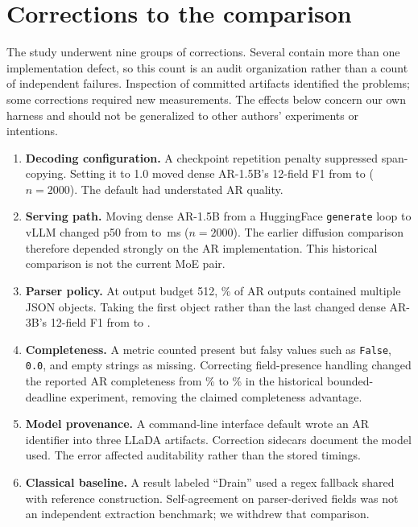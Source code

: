 \section{Corrections to the comparison}
\label{app:defects}

The study underwent nine groups of corrections. Several contain more than
one implementation defect, so this count is an audit organization rather
than a count of independent failures. Inspection of committed artifacts
identified the problems; some corrections required new measurements.
The effects below concern our own harness and should not be generalized
to other authors' experiments or intentions.

\begin{enumerate}
\item \textbf{Decoding configuration.} A checkpoint repetition penalty
suppressed span-copying. Setting it to 1.0 moved dense AR-1.5B's
12-field F1 from  to 
($n{=}2000$). The default had understated AR quality.
\item \textbf{Serving path.} Moving dense AR-1.5B from a HuggingFace
\texttt{generate} loop to vLLM changed p50 from
 to \,ms ($n{=}2000$).
The earlier diffusion comparison therefore depended strongly on the AR
implementation. This historical comparison is not the current MoE pair.
\item \textbf{Parser policy.} At output budget 512, \rambleRate\%
of AR outputs contained multiple JSON objects. Taking the first object
rather than the last changed dense AR-3B's 12-field F1 from
 to .
\item \textbf{Completeness.} A metric counted present but falsy values
such as \texttt{False}, \texttt{0.0}, and empty strings as missing.
Correcting field-presence handling changed the reported AR completeness
from \% to \% in the historical
bounded-deadline experiment, removing the claimed completeness advantage.
\item \textbf{Model provenance.} A command-line interface default wrote an AR identifier
into three LLaDA artifacts. Correction sidecars document the model used.
The error affected auditability rather than the stored timings.
\item \textbf{Classical baseline.} A result labeled ``Drain'' used a
regex fallback shared with reference construction. Self-agreement on
parser-derived fields was not an independent extraction benchmark;
we withdrew that comparison.

\end{enumerate}
